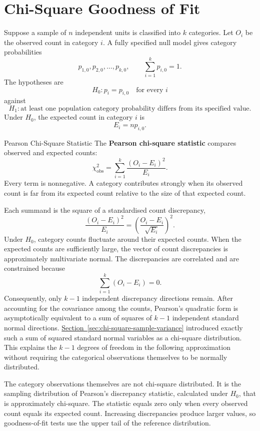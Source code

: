 \section{Chi-Square Goodness of Fit}
\label{sec:chi-square-goodness-fit}

Suppose a sample of $n$ independent units is classified into $k$ categories. Let $O_i$ be the observed count in category $i$. A fully specified null model gives category probabilities
\[
p_{1,0},p_{2,0},\ldots,p_{k,0},
\qquad
\sum_{i=1}^{k}p_{i,0}=1.
\]
The hypotheses are
\[
H_0:p_i=p_{i,0}\quad\text{for every }i
\]
against
\[
H_1:\text{at least one population category probability differs from its specified value}.
\]
Under $H_0$, the expected count in category $i$ is
\[
E_i=np_{i,0}.
\]

\begin{definition}{Pearson Chi-Square Statistic}
The \textbf{Pearson chi-square statistic} compares observed and expected counts:
\[
\chi^2_{\mathrm{obs}}
=\sum_{i=1}^{k}\frac{(O_i-E_i)^2}{E_i}.
\]
Every term is nonnegative. A category contributes strongly when its observed count is far from its expected count relative to the size of that expected count.
\end{definition}

Each summand is the square of a standardised count discrepancy,
\[
\frac{(O_i-E_i)^2}{E_i}
=
\left(\frac{O_i-E_i}{\sqrt{E_i}}\right)^2.
\]
Under $H_0$, category counts fluctuate around their expected counts. When the expected counts are sufficiently large, the vector of count discrepancies is approximately multivariate normal. The discrepancies are correlated and are constrained because
\[
\sum_{i=1}^{k}(O_i-E_i)=0.
\]
Consequently, only $k-1$ independent discrepancy directions remain. After accounting for the covariance among the counts, Pearson's quadratic form is asymptotically equivalent to a sum of squares of $k-1$ independent standard normal directions. \hyperref[sec:chi-square-sample-variance]{Section~\ref*{sec:chi-square-sample-variance}} introduced exactly such a sum of squared standard normal variables as a chi-square distribution. This explains the $k-1$ degrees of freedom in the following approximation without requiring the categorical observations themselves to be normally distributed.

The category observations themselves are not chi-square distributed. It is the sampling distribution of Pearson's discrepancy statistic, calculated under $H_0$, that is approximately chi-square. The statistic equals zero only when every observed count equals its expected count. Increasing discrepancies produce larger values, so goodness-of-fit tests use the upper tail of the reference distribution.

